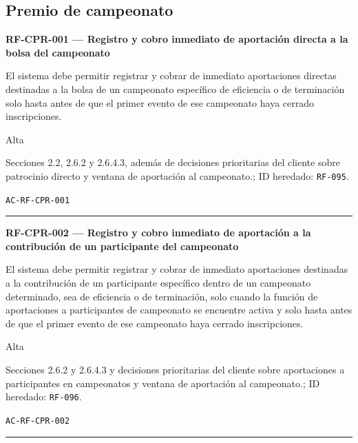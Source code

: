 \documentclass[10pt,letterpaper]{article}
\begin{document}
\subsection{Premio de campeonato}
\noindent\textbf{RF-CPR-001 --- Registro y cobro inmediato de aportación directa a la bolsa del campeonato}\par
\begin{description}[style=nextline,leftmargin=3.15cm,labelwidth=2.8cm,font=\normalfont\bfseries]
\item[Obligación] El sistema debe permitir registrar y cobrar de inmediato aportaciones directas destinadas a la bolsa de un campeonato específico de eficiencia o de terminación solo hasta antes de que el primer evento de ese campeonato haya cerrado inscripciones.
\item[Prioridad] Alta
\item[Procedencia] Secciones 2.2, 2.6.2 y 2.6.4.3, además de decisiones prioritarias del cliente sobre patrocinio directo y ventana de aportación al campeonato.; ID heredado: \texttt{RF-095}.
\item[Verificación] \texttt{AC-RF-CPR-001}
\end{description}
\vspace{0.25em}\hrule\vspace{0.65em}
\noindent\textbf{RF-CPR-002 --- Registro y cobro inmediato de aportación a la contribución de un participante del campeonato}\par
\begin{description}[style=nextline,leftmargin=3.15cm,labelwidth=2.8cm,font=\normalfont\bfseries]
\item[Obligación] El sistema debe permitir registrar y cobrar de inmediato aportaciones destinadas a la contribución de un participante específico dentro de un campeonato determinado, sea de eficiencia o de terminación, solo cuando la función de aportaciones a participantes de campeonato se encuentre activa y solo hasta antes de que el primer evento de ese campeonato haya cerrado inscripciones.
\item[Prioridad] Alta
\item[Procedencia] Secciones 2.6.2 y 2.6.4.3 y decisiones prioritarias del cliente sobre aportaciones a participantes en campeonatos y ventana de aportación al campeonato.; ID heredado: \texttt{RF-096}.
\item[Verificación] \texttt{AC-RF-CPR-002}
\end{description}
\vspace{0.25em}\hrule\vspace{0.65em}
\end{document}
